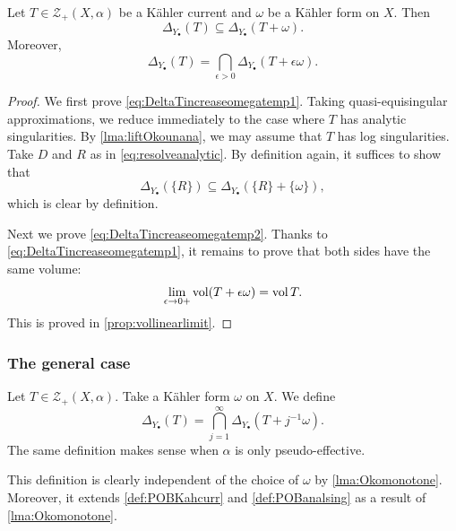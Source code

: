 \begin{lemma}\label{lma:Okomonotone}
    Let $T\in \mathcal{Z}_+(X,\alpha)$ be a Kähler current and $\omega$ be a Kähler form on $X$. Then
    \begin{equation}\label{eq:DeltaTincreaseomegatemp1}
    \Delta_{Y_{\bullet}}(T)\subseteq \Delta_{Y_{\bullet}}(T+\omega).
    \end{equation}
    Moreover,
    \begin{equation}\label{eq:DeltaTincreaseomegatemp2}
    \Delta_{Y_{\bullet}}(T)=\bigcap_{\epsilon>0}\Delta_{Y_{\bullet}}(T+\epsilon\omega).
    \end{equation}
\end{lemma}
\begin{proof}
We first prove \eqref{eq:DeltaTincreaseomegatemp1}.
    Taking quasi-equisingular approximations, we reduce immediately to the case where $T$ has analytic singularities. By \cref{lma:liftOkounana}, we may assume that $T$ has log singularities.
    Take $D$ and $R$ as in \eqref{eq:resolveanalytic}. By definition again, it suffices to show that
    \[
    \Delta_{Y_{\bullet}}(\{R\})\subseteq \Delta_{Y_{\bullet}}(\{R\}+\{\omega\}),
    \]
    which is clear by definition.

Next we prove \eqref{eq:DeltaTincreaseomegatemp2}. Thanks to \eqref{eq:DeltaTincreaseomegatemp1}, it remains to prove that both sides have the same volume:
\[
\lim_{\epsilon\to 0+}\operatorname{vol} (T+\epsilon\omega)=\operatorname{vol} T.
\]
This is proved in \cref{prop:vollinearlimit}.
\end{proof}

\subsubsection{The general case}
\label{subsubsec:tpob_general}

\begin{definition}\label{def:generalPOB}
    Let $T\in \mathcal{Z}_+(X,\alpha)$. Take a Kähler form $\omega$ on $X$. We define
    \begin{equation}\label{eq:DeltaTgeneral}
        \Delta_{Y_{\bullet}}(T)=\bigcap_{j=1}^{\infty}\Delta_{Y_{\bullet}}(T+j^{-1}\omega).
    \end{equation}
    The same definition makes sense when $\alpha$ is only pseudo-effective.
\end{definition}
This definition is clearly independent of the choice of $\omega$ by \cref{lma:Okomonotone}. Moreover, it extends \cref{def:POBKahcurr} and \cref{def:POBanalsing} as a result of \cref{lma:Okomonotone}.


